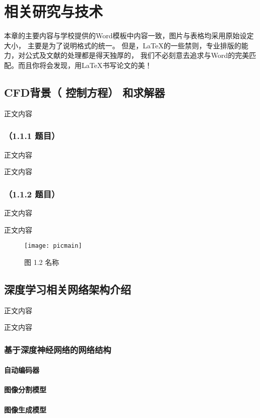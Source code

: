 \chapter{相关研究与技术}

本章的主要内容与学校提供的Word模板中内容一致，图片与表格均采用原始设定大小，%
主要是为了说明格式的统一。%
但是，\LaTeX{}的一些禁则，专业排版的能力，对公式及文献的处理都是得天独厚的，%
我们不必刻意去追求与Word的完美匹配。而且你将会发现，用\LaTeX{}书写论文的美！ %

\section{CFD背景（ 控制方程） 和求解器}
正文内容

\subsection{（1.1.1 题目）}
正文内容

正文内容


\subsection{（1.1.2 题目）}
正文内容

正文内容

\begin{figure}[htp]
\centering
\texttt{[image: picmain]}
\caption{图 1.2 名称}
\end{figure}

\section{深度学习相关网络架构介绍}
正文内容

正文内容


\subsection{基于深度神经网络的网络结构}

\subsubsection{自动编码器}

\subsubsection{图像分割模型}

\subsubsection{图像生成模型}

